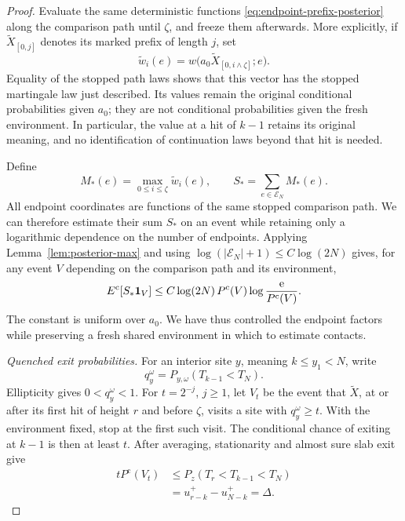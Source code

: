 \begin{proof}
Evaluate the same deterministic functions
\eqref{eq:endpoint-prefix-posterior} along the comparison path until
\(\zeta\), and freeze them afterwards.  More explicitly, if
\(\widetilde X_{[0,j]}\) denotes its marked prefix of length \(j\),
set
\[
 \widetilde w_i(e)
 =w\bigl(a_0\widetilde X_{[0,i\wedge\zeta]};e\bigr).
\]
Equality of the stopped path laws shows that this vector has the
stopped martingale law just described.  Its values remain the original
conditional probabilities given \(a_0\); they are not conditional
probabilities given the fresh environment.  In particular, the value
at a hit of \(k-1\) retains its original meaning, and no identification
of continuation laws beyond that hit is needed.

Define
\[
 M_*(e)=\max_{0\le i\le\zeta}\widetilde w_i(e),
 \qquad S_*=\sum_{e\in\mathcal E_N}M_*(e).
\]
All endpoint coordinates are functions of the same stopped comparison
path.  We can therefore estimate their sum \(S_*\) on an event while
retaining only a logarithmic dependence on the number of endpoints.
Applying Lemma~\ref{lem:posterior-max} and using
\(\log(|\mathcal E_N|+1)\le C\log(2N)\) gives, for any event \(V\)
depending on the comparison path and its environment,
\begin{equation}\label{eq:stopped-posterior-event}
 E^{\mathrm c}[S_*\mathbf 1_V]
 \le C\log(2N)\,P^{\mathrm c}(V)
                  \log\frac{\mathrm e}{P^{\mathrm c}(V)}.
\end{equation}
The constant is uniform over \(a_0\).  We have thus controlled the
endpoint factors while preserving a fresh shared environment in which
to estimate contacts.

\emph{Quenched exit probabilities.}
For an interior site \(y\), meaning \(k\le y_1<N\), write
\[
 q_y^\omega=P_{y,\omega}(T_{k-1}<T_N).
\]
Ellipticity gives \(0<q_y^\omega<1\).  For
\(t=2^{-j}\), \(j\ge1\), let \(V_t\) be the event that
\(\widetilde X\), at or after its first hit of height \(r\) and
before \(\zeta\), visits a site with \(q_y^\omega\ge t\).
With the environment fixed, stop at the first such visit.  The
conditional chance of exiting at \(k-1\) is then at least \(t\).
After averaging, stationarity and almost sure slab exit give
\begin{equation}\label{eq:first-contact-large-q}
 \begin{split}
 tP^{\mathrm c}(V_t)
 &\le P_z(T_r<T_{k-1}<T_N)\\
 &=u_{r-k}^+-u_{N-k}^+=\Delta.
 \end{split}
\end{equation}


\end{proof}
